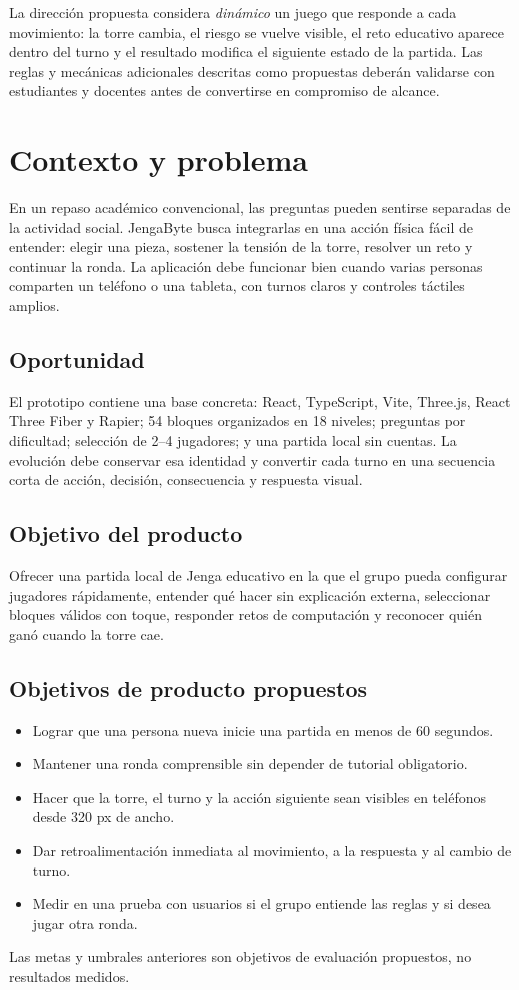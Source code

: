 \documentclass[11pt,letterpaper]{article}
\begin{document}
La dirección propuesta considera \emph{dinámico} un juego que responde a cada movimiento: la torre cambia, el riesgo se vuelve visible, el reto educativo aparece dentro del turno y el resultado modifica el siguiente estado de la partida. Las reglas y mecánicas adicionales descritas como propuestas deberán validarse con estudiantes y docentes antes de convertirse en compromiso de alcance.

\section{Contexto y problema}

En un repaso académico convencional, las preguntas pueden sentirse separadas de la actividad social. JengaByte busca integrarlas en una acción física fácil de entender: elegir una pieza, sostener la tensión de la torre, resolver un reto y continuar la ronda. La aplicación debe funcionar bien cuando varias personas comparten un teléfono o una tableta, con turnos claros y controles táctiles amplios.

\subsection{Oportunidad}
El prototipo contiene una base concreta: React, TypeScript, Vite, Three.js, React Three Fiber y Rapier; 54 bloques organizados en 18 niveles; preguntas por dificultad; selección de 2--4 jugadores; y una partida local sin cuentas. La evolución debe conservar esa identidad y convertir cada turno en una secuencia corta de acción, decisión, consecuencia y respuesta visual.

\subsection{Objetivo del producto}
Ofrecer una partida local de Jenga educativo en la que el grupo pueda configurar jugadores rápidamente, entender qué hacer sin explicación externa, seleccionar bloques válidos con toque, responder retos de computación y reconocer quién ganó cuando la torre cae.

\subsection{Objetivos de producto propuestos}
\begin{itemize}
  \item Lograr que una persona nueva inicie una partida en menos de 60 segundos.
  \item Mantener una ronda comprensible sin depender de tutorial obligatorio.
  \item Hacer que la torre, el turno y la acción siguiente sean visibles en teléfonos desde 320 px de ancho.
  \item Dar retroalimentación inmediata al movimiento, a la respuesta y al cambio de turno.
  \item Medir en una prueba con usuarios si el grupo entiende las reglas y si desea jugar otra ronda.
\end{itemize}
Las metas y umbrales anteriores son objetivos de evaluación propuestos, no resultados medidos.
\end{document}
